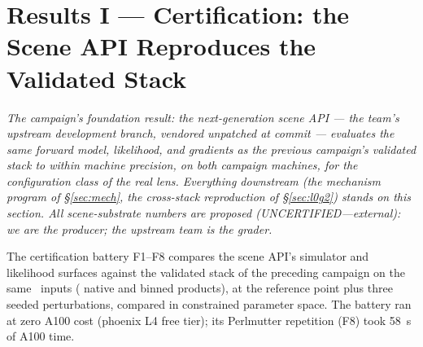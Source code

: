 
\section{Results I --- Certification: the Scene API Reproduces the
         Validated Stack}
\label{sec:cert}

\noindent\emph{The campaign's foundation result: the next-generation scene
API --- the team's upstream development branch, vendored unpatched at commit
 --- evaluates the same forward model, likelihood, and
gradients as the previous campaign's validated stack to within machine
precision, on both campaign machines, for the configuration class of the real
lens. Everything downstream (the mechanism program of
\S\ref{sec:mech}, the cross-stack reproduction of \S\ref{sec:l0g2}) stands on
this section. All scene-substrate numbers are proposed
(UNCERTIFIED---external): we are the producer; the upstream team is the
grader.}

\medskip
The certification battery F1--F8 compares the scene API's simulator and
likelihood surfaces against the
validated  stack of the preceding campaign on the same
\foundry\ inputs ( native and  binned products), at the
reference point plus three seeded perturbations, compared in constrained
parameter space. The battery ran at zero A100 cost (phoenix L4 free tier);
its Perlmutter repetition (F8) took 58~s of A100 time.

